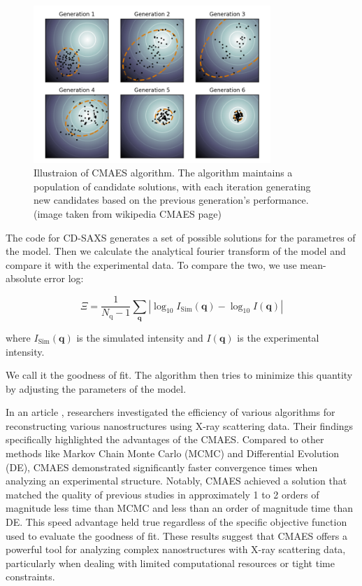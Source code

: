\begin{figure}[h]
    \centering
    \includegraphics[width=0.8\textwidth]{images/CMAES.png}
    \caption{Illustraion of CMAES algorithm. The algorithm maintains a population of candidate solutions, with each 
    iteration generating new candidates based on the previous generation's performance.(image taken from wikipedia CMAES page) }
    \label{fig:cmaes}
\end{figure}

\FloatBarrier

\medskip

The code for CD-SAXS generates a set of possible solutions for the parametres of the model. Then we calculate the 
analytical fourier transform of the model and compare it with the experimental data. To compare the two,
we use mean-absolute error log:

\medskip

\begin{equation}
    \Xi=\frac{1}{N_{\mathrm{q}}-1} \sum_{\mathbf{q}}\left|\log _{10} I_{\mathrm{Sim}}(\mathbf{q})-\log _{10} I(\mathbf{q})\right|
\end{equation}

\medskip

where $I_{\mathrm{Sim}}(\mathbf{q})$ is the simulated intensity and $I(\mathbf{q})$ is the experimental intensity.

\medskip

We call it the goodness of fit. The algorithm then tries to minimize this quantity by adjusting the parameters of the model.

\medskip

In an article \cite{hannon2016advancing}, researchers investigated the efficiency of various algorithms
for reconstructing various nanostructures using X-ray scattering data.
Their findings specifically highlighted the advantages of the CMAES. Compared to other
methods like Markov Chain Monte Carlo (MCMC) and Differential Evolution 
(DE), CMAES demonstrated significantly faster convergence times when 
analyzing an experimental structure. Notably, CMAES achieved a solution 
that matched the quality of previous studies in approximately 1 to 2 
orders of magnitude less time than MCMC and less than an order of 
magnitude time than DE. This speed advantage held true regardless 
of the specific objective function used to evaluate the goodness of fit. 
These results suggest that CMAES offers a powerful tool for analyzing 
complex nanostructures with X-ray scattering data, particularly when 
dealing with limited computational resources or tight time constraints.

